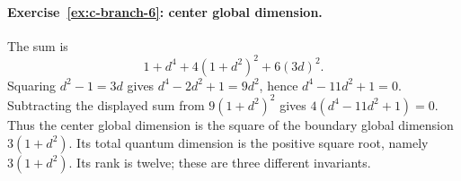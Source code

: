 \paragraph{Exercise~\ref{ex:c-branch-6}: center global dimension.}
\label{sol:ex:c-branch-6}
The sum is
\[
 1+d^4+4(1+d^2)^2+6(3d)^2.
\]
Squaring $d^2-1=3d$ gives $d^4-2d^2+1=9d^2$, hence
$d^4-11d^2+1=0$. Subtracting
the displayed sum from $9(1+d^2)^2$ gives
$4(d^4-11d^2+1)=0$. Thus the center global dimension is the square
of the boundary global dimension $3(1+d^2)$. Its total quantum
dimension is the positive square root, namely $3(1+d^2)$. Its
rank is twelve; these are three different invariants.


